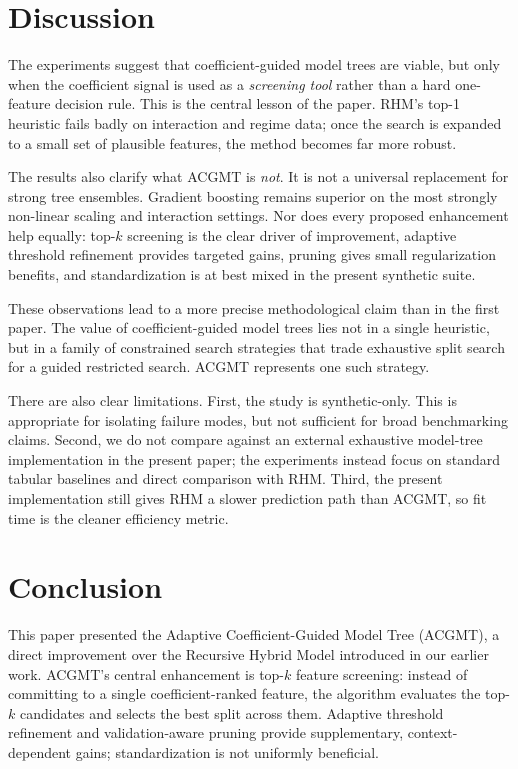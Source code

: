 \documentclass[11pt,a4paper]{article}
\begin{document}
\section{Discussion}\label{sec:discussion}

The experiments suggest that coefficient-guided model trees are viable, but only when the coefficient signal is used as a \emph{screening tool} rather than a hard one-feature decision rule. This is the central lesson of the paper. RHM's top-1 heuristic fails badly on interaction and regime data; once the search is expanded to a small set of plausible features, the method becomes far more robust.

The results also clarify what ACGMT is \emph{not}. It is not a universal replacement for strong tree ensembles. Gradient boosting remains superior on the most strongly non-linear scaling and interaction settings. Nor does every proposed enhancement help equally: top-$k$ screening is the clear driver of improvement, adaptive threshold refinement provides targeted gains, pruning gives small regularization benefits, and standardization is at best mixed in the present synthetic suite.

These observations lead to a more precise methodological claim than in the first paper. The value of coefficient-guided model trees lies not in a single heuristic, but in a family of constrained search strategies that trade exhaustive split search for a guided restricted search. ACGMT represents one such strategy.

There are also clear limitations. First, the study is synthetic-only. This is appropriate for isolating failure modes, but not sufficient for broad benchmarking claims. Second, we do not compare against an external exhaustive model-tree implementation in the present paper; the experiments instead focus on standard tabular baselines and direct comparison with RHM. Third, the present implementation still gives RHM a slower prediction path than ACGMT, so fit time is the cleaner efficiency metric.

\section{Conclusion}\label{sec:conclusion}

This paper presented the Adaptive Coefficient-Guided Model Tree (ACGMT), a direct improvement over the Recursive Hybrid Model introduced in our earlier work. ACGMT's central enhancement is top-$k$ feature screening: instead of committing to a single coefficient-ranked feature, the algorithm evaluates the top-$k$ candidates and selects the best split across them. Adaptive threshold refinement and validation-aware pruning provide supplementary, context-dependent gains; standardization is not uniformly beneficial.
\end{document}
